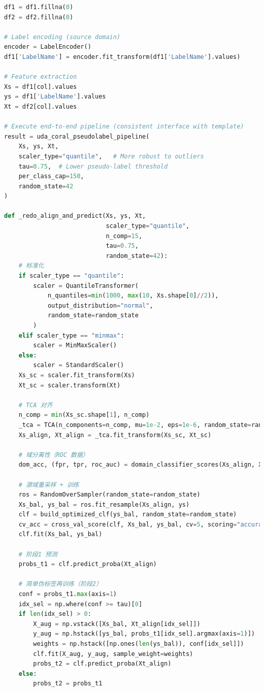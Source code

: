 \documentclass[a4paper]{CPIPC}
\numberwithin{equation}{section}
\begin{document}
\begin{lstlisting}[language=Python, caption=Random Forest Classifier]
df1 = df1.fillna(0)
df2 = df2.fillna(0)

# Label encoding (source domain)
encoder = LabelEncoder()
df1['LabelName'] = encoder.fit_transform(df1['LabelName'].values)

# Feature extraction
Xs = df1[col].values
ys = df1['LabelName'].values
Xt = df2[col].values

# Execute end-to-end pipeline (consistent interface with template)
result = uda_coral_pseudolabel_pipeline(
    Xs, ys, Xt,
    scaler_type="quantile",   # More robust to outliers
    tau=0.75,  # Lower pseudo-label threshold
    per_class_cap=150,
    random_state=42
)

def _redo_align_and_predict(Xs, ys, Xt,
                            scaler_type="quantile",
                            n_comp=15,
                            tau=0.75,
                            random_state=42):
    # 标准化
    if scaler_type == "quantile":
        scaler = QuantileTransformer(
            n_quantiles=min(1000, max(10, Xs.shape[0]//2)),
            output_distribution="normal",
            random_state=random_state
        )
    elif scaler_type == "minmax":
        scaler = MinMaxScaler()
    else:
        scaler = StandardScaler()
    Xs_sc = scaler.fit_transform(Xs)
    Xt_sc = scaler.transform(Xt)

    # TCA 对齐
    n_comp = min(Xs_sc.shape[1], n_comp)
    _tca = TCA(n_components=n_comp, mu=1e-2, eps=1e-6, random_state=random_state)
    Xs_align, Xt_align = _tca.fit_transform(Xs_sc, Xt_sc)

    # 域分离性（ROC 数据）
    dom_acc, (fpr, tpr, roc_auc) = domain_classifier_scores(Xs_align, Xt_align, random_state=random_state)

    # 源域重采样 + 训练
    ros = RandomOverSampler(random_state=random_state)
    Xs_bal, ys_bal = ros.fit_resample(Xs_align, ys)
    clf = build_optimized_clf(ys_bal, random_state=random_state)
    cv_acc = cross_val_score(clf, Xs_bal, ys_bal, cv=5, scoring="accuracy").mean()
    clf.fit(Xs_bal, ys_bal)

    # 阶段1 预测
    probs_t1 = clf.predict_proba(Xt_align)

    # 简单伪标签再训练（阶段2）
    conf = probs_t1.max(axis=1)
    idx_sel = np.where(conf >= tau)[0]
    if len(idx_sel) > 0:
        X_aug = np.vstack([Xs_bal, Xt_align[idx_sel]])
        y_aug = np.hstack([ys_bal, probs_t1[idx_sel].argmax(axis=1)])
        weights = np.hstack([np.ones(len(ys_bal)), conf[idx_sel]])
        clf.fit(X_aug, y_aug, sample_weight=weights)
        probs_t2 = clf.predict_proba(Xt_align)
    else:
        probs_t2 = probs_t1


\end{lstlisting}
\end{document}
